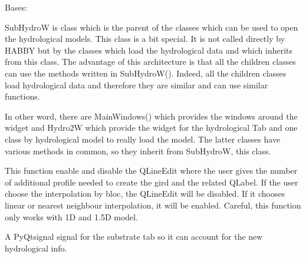 \documentclass[letterpaper,10pt,english]{sphinxmanual}
\begin{document}
\begin{fulllineitems}
\begin{fulllineitems}
\end{fulllineitems}


\end{fulllineitems}


\begin{fulllineitems}
\label{\detokenize{index:src_GUI.hydro_GUI_2.SubHydroW}}
Bases: 

SubHydroW is class which is the parent of the classes which can be used to open the hydrological models. This class
is a bit special. It is not called directly by HABBY but by the classes which load the hydrological data and which
inherits from this class. The advantage of this architecture is that all the children classes can use the methods
written in SubHydroW(). Indeed, all the children classes load hydrological data and therefore they are similar and can use
similar functions.

In other word, there are MainWindows() which provides the windows around the widget and Hydro2W which provide the widget for the
hydrological Tab and one class by hydrological model to really load the model. The latter classes have various
methods in common, so they inherit from SubHydroW, this class.

\begin{fulllineitems}
\label{\detokenize{index:src_GUI.hydro_GUI_2.SubHydroW.dis_enable_nb_profile}}
This function enable and disable the QLineEdit where the user gives the number of additional profile needed to
create the gird and the related QLabel. If the user choose the interpolation by bloc, the QLineEdit will be
disabled. If it chooses linear or nearest neighbour interpolation, it will be enabled. Careful, this function
only works with 1D and 1.5D model.

\end{fulllineitems}


\begin{fulllineitems}
\label{\detokenize{index:src_GUI.hydro_GUI_2.SubHydroW.drop_hydro}}
A PyQtsignal signal for the substrate tab so it can account for the new hydrological info.


\end{fulllineitems}
\end{fulllineitems}
\end{document}

